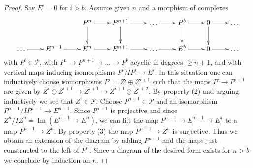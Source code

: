 \documentclass[10pt,a4paper]{amsart}
\theoremstyle{plain}
\theoremstyle{definition}
\theoremstyle{remark}
\numberwithin{equation}{subsection}
\def\Im{\mathop{\mathrm{Im}}}
\begin{document}
\begin{proof}
Say $E^i = 0$ for $i > b$. Assume given $n$ and a morphism of complexes
$$
\xymatrix{
& & P^n \ar[r] \ar[d] & P^{n + 1} \ar[r] \ar[d] & \ldots \ar[r]
& P^b \ar[r] \ar[d] & 0 \ar[r] \ar[d] & \ldots \\
\ldots \ar[r] & E^{n - 1} \ar[r] &
E^n \ar[r] & E^{n + 1} \ar[r] & \ldots \ar[r] &
E^b \ar[r] & 0 \ar[r] & \ldots
}
$$
with $P^i \in \mathcal{P}$, with
$P^n \to P^{n + 1} \to \ldots \to P^b$ acyclic in degrees $\geq n + 1$,
and with vertical maps inducing isomorphisms $P^i/IP^i \to E^i$.
In this situation one can inductively choose isomorphisms
$P^i = Z^i \oplus Z^{i + 1}$ such that the maps $P^i \to P^{i + 1}$
are given by
$Z^i \oplus Z^{i + 1} \to Z^{i + 1} \to Z^{i + 1} \oplus Z^{i + 2}$.
By property (2) and arguing inductively we see that $Z^i \in \mathcal{P}$.
Choose $P^{n - 1} \in \mathcal{P}$ and an isomorphism
$P^{n - 1}/IP^{n - 1} \to E^{n - 1}$. Since
$P^{n - 1}$ is projective and since $Z^n/IZ^n = \Im(E^{n - 1} \to E^n)$,
we can lift the map $P^{n - 1} \to E^{n - 1} \to E^n$ to a map
$P^{n - 1} \to Z^n$. By property (3) the map $P^{n - 1} \to Z^n$
is surjective. Thus we obtain an extension of the diagram
by adding $P^{n - 1}$ and the maps just constructed to the left
of $P^n$. Since a diagram of the desired form exists for $n > b$
we conclude by induction on $n$.
\end{proof}
\end{document}
